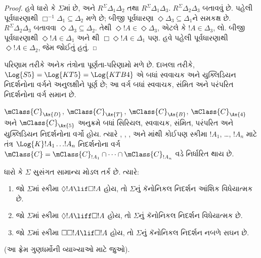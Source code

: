 \documentclass[../../../include/open-logic-section]{subfiles}
\begin{document}
\begin{proof}
  હવે ધારો કે $\Sigma$માં  છે, અને $R^\Sigma
  \Delta_1\Delta_2$ તથા $R^\Sigma \Delta_1\Delta_3$.
  $R^\Sigma \Delta_2\Delta_3$ બતાવવું છે. પહેલી પૂર્વધારણાથી
  $\Box^{-1}\Delta_1 \subseteq \Delta_2$
   મળે છે;
  બીજી પૂર્વધારણા $\Diamond\Delta_3 \subseteq \Delta_1$ને
  સમકક્ષ છે.
  $R^\Sigma \Delta_2\Delta_3$ બતાવવા
  $\Diamond\Delta_3 \subseteq \Delta_2$.
  તેથી $\Diamond!A \in \Diamond\Delta_3$, એટલે કે
  $!A \in \Delta_3$, લો. બીજી પૂર્વધારણાથી
  $\Diamond!A \in \Delta_1$ અને થી
  $\Box\Diamond!A \in \Delta_1$ પણ. હવે પહેલી પૂર્વધારણાથી
  $\Diamond!A \in \Delta_2$, જેમ જોઈતું હતું.
  \end{proof}

પરિણામ તરીકે અનેક તંત્રોના પૂર્ણતા-પરિણામો મળે છે. દાખલા તરીકે,
$\Log{S5} = \Log{KT5} = \Log{KTB4}$ એ બધાં સ્વવાચક અને
યુક્લિડિયન નિદર્શનોના વર્ગને અનુલક્ષીને પૂર્ણ છે; આ વર્ગ બધાં
સ્વવાચક, સંમિત અને પરંપરિત નિદર્શનોના વર્ગ સમાન છે.

\begin{thm}
  $\mClass{C}_\Ax{D}$, $\mClass{C}_\Ax{T}$,
  $\mClass{C}_\Ax{B}$, $\mClass{C}_\Ax{4}$ અને
  $\mClass{C}_\Ax{5}$ અનુક્રમે બધાં સિરિયલ, સ્વવાચક,
  સંમિત, પરંપરિત અને યુક્લિડિયન નિદર્શનોના વર્ગો હોય. ત્યારે
  , , ,  અને માંથી કોઈપણ
  સ્કીમા $!A_1$, \dots, $!A_n$ માટે તંત્ર
  $\Log{K}!A_1 \dots !A_n$ નિદર્શનોના વર્ગ
  $\mClass{C} = \mClass{C}_{!A_1} \cap \dots
  \cap \mClass{C}_{!A_n}$ વડે નિર્ધારિત થાય છે.
\end{thm}

\begin{prop}
  ધારો કે $\Sigma$ સુસંગત સામાન્ય મોડલ તર્ક છે. ત્યારે:
  \begin{enumerate}
  \item{}%
    જો $\Sigma$માં સ્કીમા $\Diamond!A \lif \Box
    !A$ હોય, તો $\Sigma$નું કૅનોનિકલ નિદર્શન આંશિક વિધેયાત્મક છે.
  \item જો $\Sigma$માં સ્કીમા $\Diamond!A \liff \Box
    !A$ હોય, તો $\Sigma$નું કૅનોનિકલ નિદર્શન વિધેયાત્મક છે.
  \item જો $\Sigma$માં સ્કીમા $\Box\Box!A \lif \Box
    !A$ હોય, તો $\Sigma$નું કૅનોનિકલ નિદર્શન નબળે સઘન છે.
  \end{enumerate}
(આ ફ્રેમ ગુણધર્મોની વ્યાખ્યાઓ માટે 
  જુઓ).
\end{prop}
\end{document}
